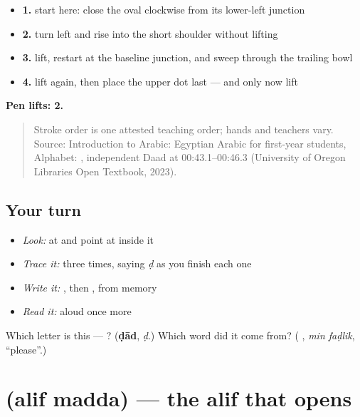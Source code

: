 \begin{itemize}
\raggedright
  \item \textbf{1.} start here: close the oval clockwise from its lower-left junction
  \item \textbf{2.} turn left and rise into the short shoulder without lifting
  \item \textbf{3.} lift, restart at the baseline junction, and sweep through the trailing bowl
  \item \textbf{4.} lift again, then place the upper dot last — and only now lift
\end{itemize}

\textbf{Pen lifts: 2.}

\begin{quote}
Stroke order is one attested teaching order; hands and teachers vary. Source: Introduction to Arabic: Egyptian Arabic for first-year students, Alphabet:    , independent Daad at 00:43.1–00:46.3 (University of Oregon Libraries Open Textbook, 2023).
\end{quote}

\subsection*{Your turn}
\begin{itemize}
\raggedright
  \item \emph{Look:} at \textbf{ } and point at  inside it
  \item \emph{Trace it:}  three times, saying \emph{ḍ} as you finish each one
  \item \emph{Write it:} , then , from memory
  \item \emph{Read it:} \textbf{ } aloud once more
\end{itemize}

\begin{tcolorbox}[breakable,colback=teal!4,colframe=teal!35!black,title={Before you move on}]
Which letter is this — ? (\textbf{ḍād}, \emph{ḍ}.) Which word did it come from? (\textbf{ }, \emph{min faḍlik}, \textquotedblleft{}please\textquotedblright{}.)
\end{tcolorbox}
\section[\texorpdfstring{\ar{آ} (alif madda)}{آ (alif madda)}]{ (alif madda) — the alif that opens }

